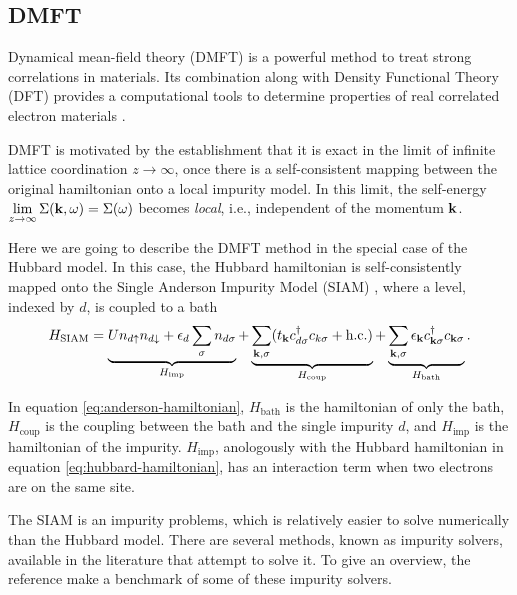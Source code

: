 \documentclass[12pt]{report}
\begin{document}
\subsection{DMFT} \label{sec:dmft}

Dynamical mean-field theory (DMFT) is a powerful method to treat strong correlations in materials. Its combination along with Density Functional Theory (DFT) provides a computational tools to determine properties of real correlated electron materials \cite{hauleweb, haule_real_materials}.

\n

DMFT is motivated by the establishment that it is exact \cite{thesis_dmft_graz} in the limit of infinite lattice coordination $z \to \infty$, once there is a self-consistent mapping between the original hamiltonian onto a local impurity model. In this limit, the self-energy $\displaystyle{\lim_{z \to \infty}\Sigma({\vb{k}},\omega) = \Sigma(\omega)}$ becomes \textit{local}, i.e., independent of the momentum ${\vb{k}}$.

Here we are going to describe the DMFT method in the special case of the Hubbard model. In this case, the Hubbard hamiltonian is self-consistently mapped \cite{georges1996} onto the Single Anderson Impurity Model (SIAM) \cite{impurity-solvers}, where a level, indexed by $d$, is coupled to a bath
\begin{equation} \label{eq:anderson-hamiltonian}
H_{\text{SIAM}} = \underbrace{U n_{d{\uparrow}} n_{d{\downarrow}} + \epsilon_d \sum_{{\sigma}} n_{d{\sigma}}}_{H_{\text{imp}}}
+ \underbrace{\sum_{{\vb{k}},{\sigma}} (t_{\vb{k}} c_{d{\sigma}}^{\dagger} c_{k{\sigma}} + {\text{h.c.}})}_{H_{\text{coup}}}
+ \underbrace{\sum_{{\vb{k}},{\sigma}} \epsilon_{\vb{k}} c_{{\vb{k}}{\sigma}}^{\dagger} c_{{\vb{k}}{\sigma}}}_{H_{\text{bath}}}.
\end{equation}

In equation \ref{eq:anderson-hamiltonian}, $H_{\text{bath}}$ is the hamiltonian of only the bath, $H_{\text{coup}}$ is the coupling between the bath and the single impurity $d$, and $H_{\text{imp}}$ is the hamiltonian of the impurity. $H_{\text{imp}}$, anologously with the Hubbard hamiltonian in equation \ref{eq:hubbard-hamiltonian}, has an interaction term when two electrons are on the same site.

The SIAM is an impurity problems, which is relatively easier to solve numerically than the Hubbard model. There are several methods, known as impurity solvers, available in the literature that attempt to solve it. To give an overview, the reference \cite{impurity-solvers} make a benchmark of some of these impurity solvers.
\end{document}
